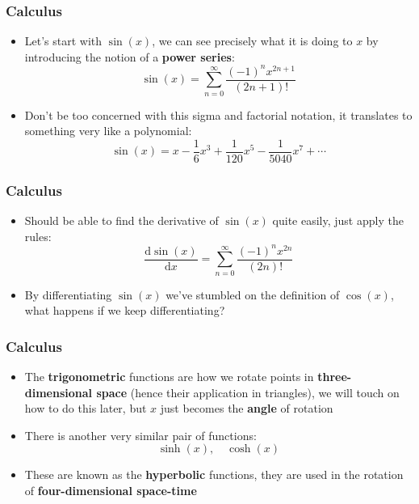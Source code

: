 \documentclass{beamer}
\begin{document}
\begin{frame}
  \frametitle{Calculus}
  \begin{itemize}
    \item<1-> Let's start with $\sin(x)$, we can see precisely what it is doing to $x$ by introducing the notion of a \textbf{power series}:
      \begin{equation*}
	\sin(x)=\sum_{n=0}^{\infty}\frac{(-1)^nx^{2n+1}}{(2n+1)!}
      \end{equation*}
    \item<2-> Don't be too concerned with this sigma and factorial notation, it translates to something very like a polynomial:
      \begin{equation*}
	\sin(x)=x-\frac{1}{6}x^3+\frac{1}{120}x^5-\frac{1}{5040}x^7+\cdots
	\label{<+label+>}
      \end{equation*}
    \end{itemize}
\end{frame}

\begin{frame}
  \frametitle{Calculus}
  \begin{itemize}
    \item<1-> Should be able to find the derivative of $\sin(x)$ quite easily, just apply the rules:
      \begin{equation*}
	\frac{\mathrm{d}\sin(x)}{\mathrm{d}x}=\sum_{n=0}^{\infty}\frac{(-1)^nx^{2n}}{(2n)!}
	\label{<+label+>}
      \end{equation*}
    \item<2-> By differentiating $\sin(x)$ we've stumbled on the definition of $\cos(x)$, what happens if we keep differentiating?
  \end{itemize}
\end{frame}

\begin{frame}
  \frametitle{Calculus}
  \begin{itemize}
    \item<1-> The \textbf{trigonometric} functions are how we rotate points in \textbf{three-dimensional space} (hence their application in triangles), we will touch on how to do this later, but $x$ just becomes the  \textbf{angle} of rotation
    \item<2-> There is another very similar pair of functions:
      \begin{equation*}
	\sinh(x), \quad \cosh(x)
      \end{equation*}
    \item<3-> These are known as the \textbf{hyperbolic} functions, they are used in the rotation of \textbf{four-dimensional space-time}
  \end{itemize}
\end{frame}
\end{document}

